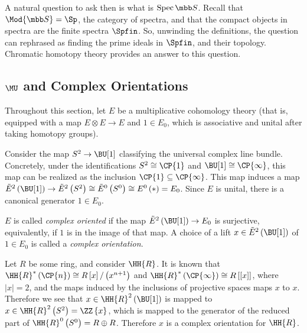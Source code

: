 A natural question to ask then is what is $\spec \SS$.
Recall that $\Mod{\SS} = \Sp$, the category of spectra, and that the compact objects in spectra are the finite spectra $\Spfin$.
So, unwinding the definitions, the question can rephrased as finding the prime ideals in $\Spfin$, and their topology.
Chromatic homotopy theory provides an answer to this question.



\subsection{\texorpdfstring{$\MU$}{MU} and Complex Orientations}

Throughout this section, let $E$ be a multiplicative cohomology theory (that is, equipped with a map $E \otimes E \to E$ and $1 \in E_0$, which is associative and unital after taking homotopy groups).

Consider the map $S^2 \to \BU[1]$ classifying the universal complex line bundle.
Concretely, under the identifications $S^2 \cong \CP{1}$ and $\BU[1] \cong \CP{\infty}$, this map can be realized as the inclusion $\CP{1} \subseteq \CP{\infty}$.
This map induces a map
$
\tilde{E}^2\left(\BU[1]\right)
\to \tilde{E}^2\left(S^2\right)
\cong \tilde{E}^0\left(S^0\right)
\cong E^0\left(*\right)
= E_0
$.
Since $E$ is unital, there is a canonical generator $1 \in E_0$.

\begin{definition}
	$E$ is called \emph{complex oriented} if the map $\tilde{E}^2\left(\BU[1]\right) \to E_0$ is surjective, equivalently, if $1$ is in the image of that map.
	A choice of a lift $x \in \tilde{E}^2\left(\BU[1]\right)$ of $1 \in E_0$ is called a \emph{complex orientation}.
\end{definition}

\begin{example}
	Let $R$ be some ring, and consider $\HH{R}$.
	It is known that
	$\HH{R}^*\left(\CP{n}\right) \cong R \left[x\right] / \left(x^{n+1}\right)$
	and
	$\HH{R}^*\left(\CP{\infty}\right) \cong R \left[\left[x\right]\right]$,
	where $\left|x\right| = 2$,
	and the maps induced by the inclusions of projective spaces maps $x$ to $x$.
	Therefore we see that $x \in \HH{R}^2\left(\BU[1]\right)$ is mapped to $x \in \HH{R}^2\left(S^2\right) = \ZZ\left\{x\right\}$, which is mapped to the generator of the reduced part of $\HH{R}^0\left(S^0\right) = R \oplus R$.
	Therefore $x$ is a complex orientation for $\HH{R}$.
\end{example}

